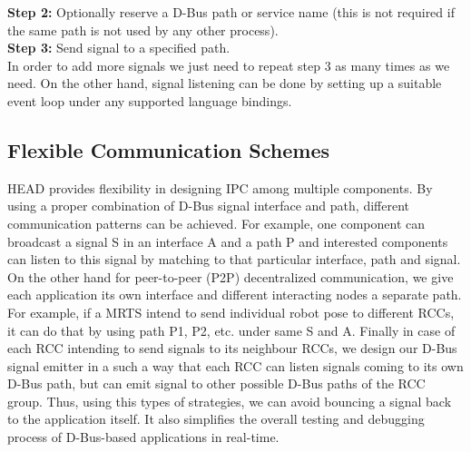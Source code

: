 \documentclass{ifacconf}
\begin{document}
\textbf{Step 2:} Optionally reserve a D-Bus path or service name (this is not required if the same path is not used by any other process).\\
\textbf{Step 3:} Send signal to a specified path. \\
In order to add more signals we just need to repeat step 3 as many times as we need. On the other hand, signal listening can be done by setting up a suitable event loop under any supported language bindings.
\subsection{Flexible Communication  Schemes}
HEAD provides flexibility in designing IPC among multiple components. By using a proper combination of D-Bus signal interface and path, different communication patterns can be achieved. For example, one component can broadcast a signal S in an interface A and a path P and interested components can listen to this signal by matching to that particular interface, path and signal. On the other hand for peer-to-peer (P2P) decentralized communication,  we give each application its own interface and different interacting nodes a separate path.  For example, if a MRTS intend to send individual robot pose to different RCCs, it can do that by using path P1,  P2, etc. under same S and A. Finally in case of each RCC intending to send signals to its neighbour RCCs, we design our D-Bus signal emitter in a such a way that each RCC can listen signals coming to its own D-Bus path, but can emit  signal to other possible D-Bus paths of the RCC group. Thus, using this types of strategies, we can avoid bouncing a signal back to the application itself. It also simplifies the overall testing and debugging process of D-Bus-based applications in real-time. 
\end{document}
